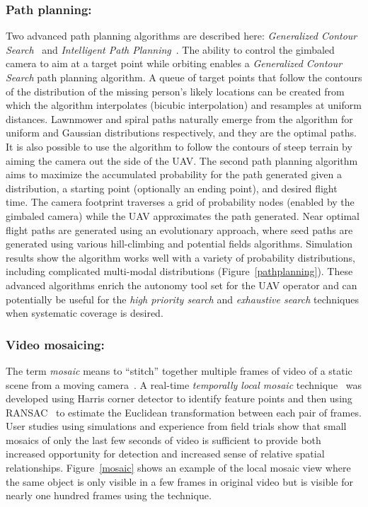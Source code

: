 \subsubsection{Path planning:}
Two advanced path planning algorithms are described here: \textit{Generalized Contour Search}~\cite{Goodrich2008Supporting} and \textit{Intelligent Path Planning}~\cite{Lin2009UAV}. The ability to control the gimbaled camera to aim at a target point while orbiting enables a \textit{Generalized Contour Search} path planning algorithm. A queue of target points that follow the contours of the distribution of the missing person's likely locations can be created from which the algorithm interpolates (bicubic interpolation) and resamples at uniform distances. Lawnmower and spiral paths naturally emerge from the algorithm for uniform and Gaussian distributions respectively, and they are the optimal paths. It is also possible to use the algorithm to follow the contours of steep terrain by aiming the camera out the side of the UAV. The second path planning algorithm aims to maximize the accumulated probability for the path generated given a distribution, a starting point (optionally an ending point), and desired flight time. The camera footprint traverses a grid of probability nodes (enabled by the gimbaled camera) while the UAV approximates the path generated. Near optimal flight paths are generated using an evolutionary approach, where seed paths are generated using various hill-climbing and potential fields algorithms. Simulation results show the algorithm works well with a variety of probability distributions, including complicated multi-modal distributions (Figure~\ref{pathplanning}). These advanced algorithms enrich the autonomy tool set for the UAV operator and can potentially be useful for the \textit{high priority search} and \textit{exhaustive search} techniques when systematic coverage is desired.


\subsubsection{Video mosaicing:}
The term \textit{mosaic} means to ``stitch'' together multiple frames of video of a static scene from a moving camera~\cite{Szeliski2006Image}. A real-time \textit{temporally local mosaic} technique~\cite{Morse2008Application} was developed using Harris corner detector to identify feature points and then using RANSAC~\cite{Fischler1981Random} to estimate the Euclidean transformation between each pair of frames. User studies using simulations and experience from field trials show that small mosaics of only the last few seconds of video is sufficient to provide both increased opportunity for detection and increased sense of relative spatial relationships. Figure~\ref{mosaic} shows an example of the local mosaic view where the same object is only visible in a few frames in original video but is visible for nearly one hundred frames using the technique.

